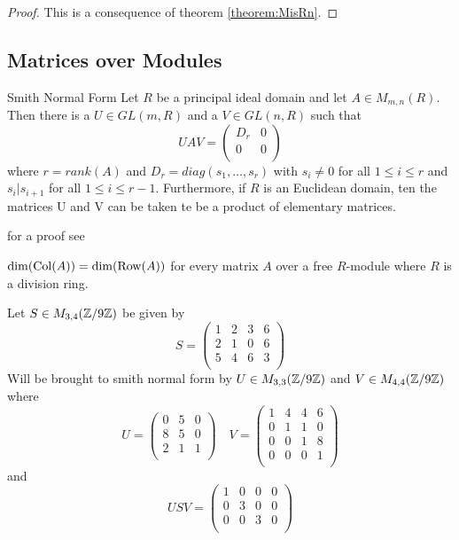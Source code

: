 \begin{proof}
	This is a consequence of theorem \ref{theorem:MisRn}.
\end{proof}

\subsection{Matrices over Modules}

\begin{proposition}{Smith Normal Form}
	Let $R$ be a principal ideal domain and let $A\in M_{m,n}(R)$. Then
	there is a $U\in GL(m,R)$ and a $V\in GL(n,R)$ such that
	\[
		UAV=\left(
		\begin{array}{cc}
			D_r & 0 \\
			0   & 0 \\
		\end{array}
		\right)
	\]
	where $r=rank(A)$ and $D_r = diag(s_{1},\ldots,s_{r})$ with
	$s_{i}\not=0$ for all $1\le i \le r$ and $s_{i} | s_{i+1}$ for all $1\le
	i \le r-1$. Furthermore, if $R$ is an Euclidean domain, ten the matrices
	U and V can be taken te be a product of elementary matrices.
\end{proposition}

for a proof see \cite{adkins92}

\begin{corollary}\label{corollary:dimcolisdimrow}
	$\dim(\operatorname{Col}(A)) = \dim(\operatorname{Row}(A))$ for every matrix $A$ over a free
	$R$-module where $R$ is a division ring.
\end{corollary}

\begin{example}
	Let $S\in M_{3,4}(\mathbb{Z}/9\mathbb{Z})$ be given by
	\[
		S = \left(
		\begin{array}{cccc}
			1 & 2 & 3 & 6 \\
			2 & 1 & 0 & 6 \\
			5 & 4 & 6 & 3 \\
		\end{array}
		\right)
	\]
	Will be brought to smith normal form by $U\in M_{3,3}(\mathbb{Z}/9\mathbb{Z})$ and $V\in
	M_{4,4}(\mathbb{Z}/9\mathbb{Z})$ where
	\[
		U = \left(
		\begin{array}{ccc}
			0 & 5 & 0 \\
			8 & 5 & 0 \\
			2 & 1 & 1 \\
		\end{array}
		\right)
		\quad
		V = \left(
		\begin{array}{cccc}
			1 & 4 & 4 & 6 \\
			0 & 1 & 1 & 0 \\
			0 & 0 & 1 & 8 \\
			0 & 0 & 0 & 1 \\
		\end{array}
		\right)
	\]
	and
	\[
		USV = \left(
		\begin{array}{cccc}
			1 & 0 & 0 & 0 \\
			0 & 3 & 0 & 0 \\
			0 & 0 & 3 & 0 \\
		\end{array}
		\right)
	\]
\end{example}


